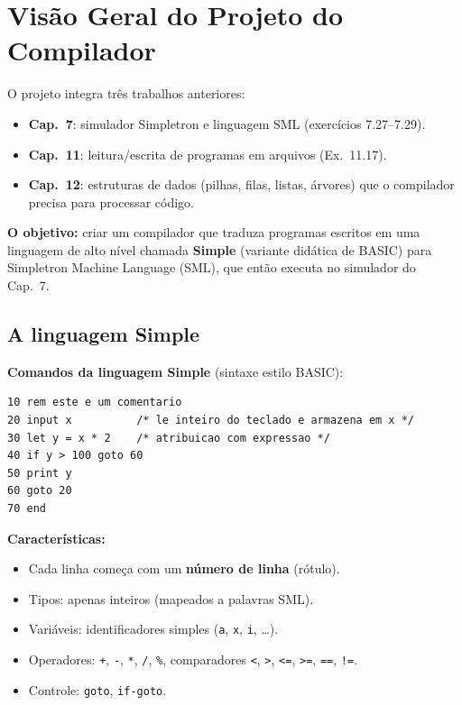 \documentclass[12pt,a4paper]{article}
\begin{document}
\section{Visão Geral do Projeto do Compilador}

\begin{enunciadoBox}
O projeto integra três trabalhos anteriores:
\begin{itemize}[noitemsep]
  \item \textbf{Cap.~7}: simulador Simpletron e linguagem SML (exercícios 7.27--7.29).
  \item \textbf{Cap.~11}: leitura/escrita de programas em arquivos (Ex.~11.17).
  \item \textbf{Cap.~12}: estruturas de dados (pilhas, filas, listas, árvores) que
  o compilador precisa para processar código.
\end{itemize}

\textbf{O objetivo:} criar um compilador que traduza programas escritos em uma
linguagem de alto nível chamada \textbf{Simple} (variante didática de BASIC)
para Simpletron Machine Language (SML), que então executa no simulador do Cap.~7.
\end{enunciadoBox}

\subsection*{A linguagem Simple}

\begin{respostabox}
\textbf{Comandos da linguagem Simple} (sintaxe estilo BASIC):

\begin{lstlisting}
10 rem este e um comentario
20 input x          /* le inteiro do teclado e armazena em x */
30 let y = x * 2    /* atribuicao com expressao */
40 if y > 100 goto 60
50 print y
60 goto 20
70 end
\end{lstlisting}

\textbf{Características:}
\begin{itemize}[noitemsep]
  \item Cada linha começa com um \textbf{número de linha} (rótulo).
  \item Tipos: apenas inteiros (mapeados a palavras SML).
  \item Variáveis: identificadores simples (\texttt{a}, \texttt{x}, \texttt{i}, \ldots).
  \item Operadores: \texttt{+}, \texttt{-}, \texttt{*}, \texttt{/}, \texttt{\%},
  comparadores \texttt{<}, \texttt{>}, \texttt{<=}, \texttt{>=}, \texttt{==},
  \texttt{!=}.
  \item Controle: \texttt{goto}, \texttt{if-goto}.
\end{itemize}
\end{respostabox}
\end{document}
